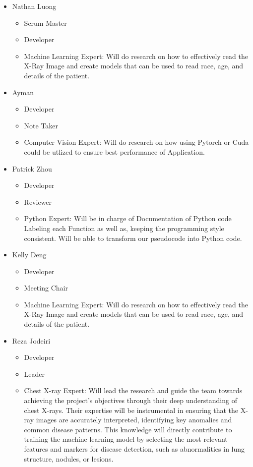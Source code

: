 \documentclass{article}
\begin{document}
\begin{itemize}
\item Nathan Luong
    \begin{itemize}
        \item Scrum Master
        \item Developer
        \item Machine Learning Expert: Will do research on how to effectively read the X-Ray Image and create models that can be used to read race, age, and details of the patient. 
    \end{itemize}
    \item Ayman
    \begin{itemize}
        \item Developer
        \item Note Taker
        \item Computer Vision Expert: Will do research on how using Pytorch or Cuda could be utlized to ensure best performance of Application. 
    \end{itemize}
\item Patrick Zhou
    \begin{itemize}
        \item Developer
        \item Reviewer
        \item Python Expert: Will be in charge of Documentation of Python code Labeling each Function as well as, keeping the programming style consistent. Will be able to transform our pseudocode  into Python code. 
    \end{itemize}
        
\item Kelly Deng
    \begin{itemize}
        \item Developer
        \item Meeting Chair
        \item Machine Learning Expert: Will do research on how to effectively read the X-Ray Image and create models that can be used to read race, age, and details of the patient. 
    \end{itemize}
\item Reza Jodeiri
    \begin{itemize}
        \item Developer
        \item Leader 
        \item Chest X-ray Expert: Will lead the research and guide the team towards achieving the project’s objectives through their deep understanding of chest X-rays. Their expertise will be instrumental in ensuring that the X-ray images are accurately interpreted, identifying key anomalies and common disease patterns. This knowledge will directly contribute to training the machine learning model by selecting the most relevant features and markers for disease detection, such as abnormalities in lung structure, nodules, or lesions. 
    \end{itemize}
\end{itemize}
  
\end{document}
